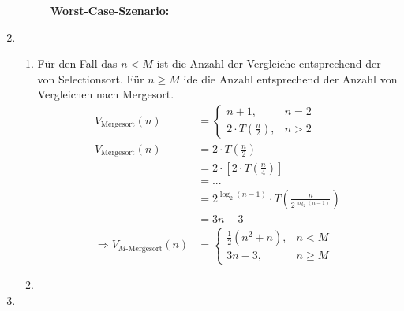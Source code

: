 \documentclass[a4paper,10pt]{scrartcl}
\begin{document}
\begin{enumerate}
\begin{description}
\textbf{Worst-Case-Szenario:} 
      \end{description}
\item \begin{enumerate}
       \item Für den Fall das $n < M$ ist die Anzahl der Vergleiche entsprechend der von Selectionsort.
             Für $n \geq M$ ide die Anzahl entsprechend der Anzahl von Vergleichen nach Mergesort.
             \begin{align*}
              V_{\text{Mergesort}}(n) &= \begin{cases}
                                         n+1, & n = 2 \\
                                         2 \cdot T\left(\frac{n}{2}\right), & n > 2
                                        \end{cases}\\
              V_{\text{Mergesort}}(n) &= 2 \cdot T\left(\frac{n}{2}\right)\\
                                      &= 2 \cdot \left[2 \cdot T\left(\frac{n}{4}\right)\right]\\
                                      &= ...\\
                                      &= 2^{\log_2 (n-1)} \cdot T\left(\frac{n}{2^{\log_2 (n-1)}}\right)\\
                                      &= 3n-3\\
            \Rightarrow V_{\text{$M$-Mergesort}}(n) &= \begin{cases}
                              \frac{1}{2} \left(n^2 + n\right),& n < M \\
                              3n - 3, & n \geq M
                             \end{cases}
             \end{align*}
       \item 
      \end{enumerate}
\item 
\end{enumerate}
\end{document}
